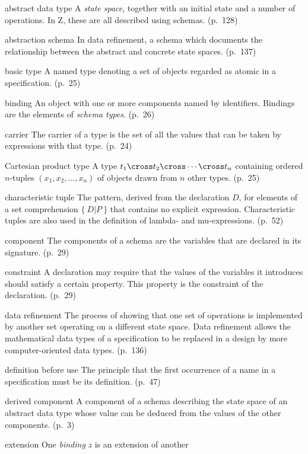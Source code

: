 \begin{theglossary}
\item[abstract data type] A {\em state space}, together with an initial
  state and a number of operations. In Z, these are all described using
  schemas. (p.~128)
\item[abstraction schema] In data refinement, a schema which documents
  the relationship between the abstract and concrete state spaces.
  (p.~137)
\item[basic type] A named type denoting a set of objects regarded as
  atomic in a specification. (p.~25)
\item[binding] An object with one or more components named by
  identifiers. Bindings are the elements of {\em schema types}. (p.~26)
\item[carrier] The carrier of a type is the set of all the values that
  can be taken by expressions with that type. (p.~24)
\item[Cartesian product type] A type $t_1 \cross t_2 \cross \cdots
  \cross t_n$ containing ordered $n$-tuples $(x_1, x_2, \ldots, x_n)$ of
  objects drawn from $n$ other types. (p.~25)
\item[characteristic tuple] The pattern, derived from the declaration
  $D$, for elements of a set comprehension $\{~D | P~\}$ that contains
  no explicit expression. Characteristic tuples are also used in the
  definition of lambda- and mu-expressions. (p.~52)
\item[component] The components of a schema are the variables that are
  declared in its signature. (p.~29)
\item[constraint] A declaration may require that the values of the
  variables it introduces should satisfy a certain property. This
  property is the constraint of the declaration. (p.~29)
\item[data refinement] The process of showing that one set of operations
  is implemented by another set operating on a different state space.
  Data refinement allows the mathematical data types of a specification
  to be replaced in a design by more computer-oriented data types.
  (p.~136)
\item[definition before use] The principle that the first occurrence of
  a name in a specification must be its definition. (p.~47)
\item[derived component] A component of a schema describing the state
  space of an abstract data type whose value can be deduced from the
  values of the other components. (p.~3)
\item[extension] One {\em binding\/} $z$ is an extension of another

\end{theglossary}
